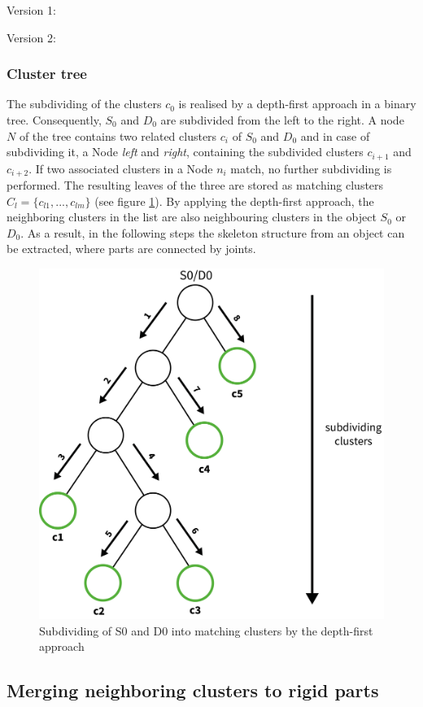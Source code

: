 \documentclass[a4paper,english,11pt]{report}
\begin{document}
Version 1:



Version 2:

\subsubsection{Cluster tree}
\label{tree}

The subdividing of the clusters $c_0$ is realised by a depth-first approach in a binary tree. Consequently, $S_0$ and $D_0$ are subdivided from the left to the right. A node $N$ of the tree contains two related clusters $c_i$ of $S_0$ and $D_0$ and in case of subdividing it, a Node \textit{left} and \textit{right}, containing the subdivided clusters $c_{i+1}$ and $c_{i+2}$. If two associated clusters in a Node $n_i$ match, no further subdividing is performed. The resulting leaves of the three are stored as matching clusters $C_l = \{{c_{l1}, ... , c_{lm}}\}$ (see figure \ref{fig:illustrationTree}). By applying the depth-first approach, the neighboring clusters in the list are also neighbouring clusters in the object $S_0$ or $D_0$.  As a result, in the following steps the skeleton structure from an object can be extracted, where parts are connected by joints.

\begin{figure}
	\centering
	\includegraphics[width=0.7\linewidth]{IllustrationTree}
	\caption{Subdividing of S0 and D0 into matching clusters by the depth-first approach}
	\label{fig:illustrationTree}
\end{figure}

\subsection{Merging neighboring clusters to rigid parts}
\end{document}
